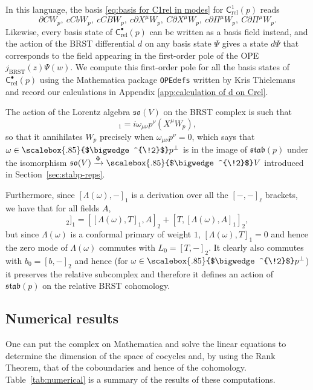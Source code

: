 \documentclass[11pt,reqno,a4paper,final]{amsart}
\newcommand\ext[1]{\scalebox{.85}{$\bigwedge^{\!#1}$}}
\theoremstyle{plain}
\theoremstyle{definition}
\renewcommand{\d}{\partial}
\newcommand{\so}{\mathfrak{so}}
\newcommand{\Crel}{\mathsf{C}_{\mathrm{rel}}} %
\newcommand{\stab}{\mathfrak{stab}}
\newcommand{\1}{\mathbb{1}}
\numberwithin{equation}{section}
\begin{document}
In this language, the basis \eqref{eq:basis for C1rel in modes} for $\Crel^1(p)$ reads
\begin{equation}
    \d C W_p,\ cCb W_p,\ cCB W_p,\ c\d X^\mu W_p,\ C\d X^\mu W_p,\ c\d \Pi^\mu W_p,\ C\d\Pi^\mu W_p.
\end{equation}
Likewise, every basis state of $\Crel^\bullet(p)$ can be written as a
basis field instead, and the action of the BRST differential $d$ on
any basis state $\Psi$ gives a state $d \Psi$ that corresponds to the field appearing in the first-order pole of the OPE $j_\mathrm{BRST}(z)
\Psi(w)$. We compute this first-order pole for all the basis states of
$\Crel^\bullet(p)$ using the Mathematica package \texttt{OPEdefs}
written by Kris Thielemans
\cite{Thielemans:1991uw,Thielemans:1992mu,Thielemans:1994er} and
record our calculations in Appendix \ref{app:calculation of d on Crel}.

The action of the Lorentz algebra $\so(V)$ on the BRST complex is such
that
\begin{equation}
  [\Lambda(\omega), W_p]_1 = i \omega_{\mu\nu} p^\nu (X^\mu W_p),
\end{equation}
so that it annihilates $W_p$ precisely when $\omega_{\mu\nu} p^\nu =
0$, which says that $\omega \in \ext{2}p^\perp$ is in the image of
$\stab(p)$ under the isomorphism $\so(V) \xrightarrow{\Phi} \ext{2} V$
introduced in Section~\ref{sec:stabp-reps}.

Furthermore, since $[\Lambda(\omega),-]_1$ is a derivation over all
the $[-,-]_\ell$ brackets, we have that for all fields $A$,
\begin{equation}
  [\Lambda(\omega), [T,A]_2]_1 = [[\Lambda(\omega), T]_1, A]_2 + [T, [\Lambda(\omega),A]_1]_2,
\end{equation}
but since $\Lambda(\omega)$ is a conformal primary of weight $1$,
$[\Lambda(\omega),T]_1 = 0$ and hence the zero mode of
$\Lambda(\omega)$ commutes with $L_0 = [T,-]_2$.  It clearly also
commutes with $b_0 = [b,-]_2$ and hence (for $\omega \in
\ext{2}p^\perp$) it preserves the relative subcomplex and therefore it
defines  an action of $\stab(p)$ on the relative BRST cohomology.

\subsection{Numerical results}
\label{sec:numerical-results}

One can put the complex on Mathematica and solve the linear equations
to determine the dimension of the space of cocycles and, by using the
Rank Theorem, that of the coboundaries and hence of the cohomology.
Table~\ref{tab:numerical} is a summary of the results of these
computations.
\end{document}
